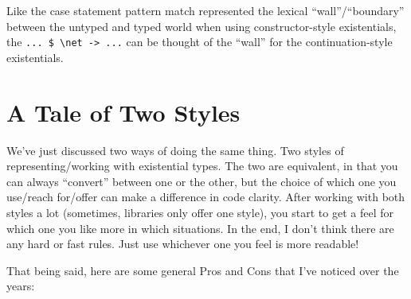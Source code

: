 \documentclass[]{article}
\begin{document}
Like the case statement pattern match represented the lexical
``wall''/``boundary'' between the untyped and typed world when using
constructor-style existentials, the
\texttt{...\ \$\ \textbackslash{}net\ -\textgreater{}\ ...} can be thought of
the ``wall'' for the continuation-style existentials.

\section{A Tale of Two Styles}\label{a-tale-of-two-styles}

We've just discussed two ways of doing the same thing. Two styles of
representing/working with existential types. The two are equivalent, in that you
can always ``convert'' between one or the other, but the choice of which one you
use/reach for/offer can make a difference in code clarity. After working with
both styles a lot (sometimes, libraries only offer one style), you start to get
a feel for which one you like more in which situations. In the end, I don't
think there are any hard or fast rules. Just use whichever one you feel is more
readable!

That being said, here are some general Pros and Cons that I've noticed over the
years:
\end{document}
